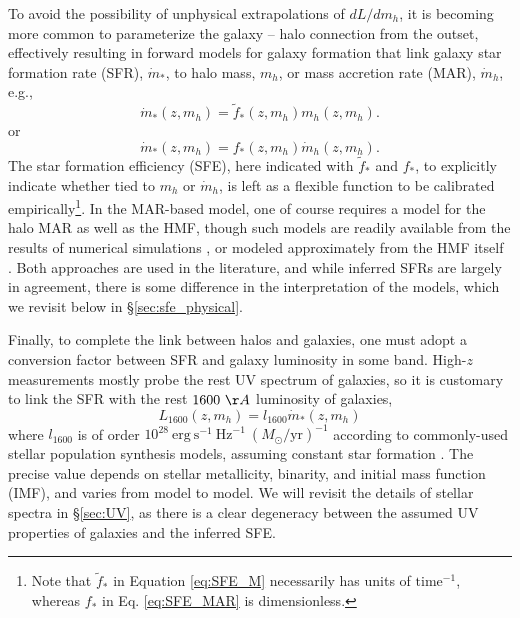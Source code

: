 To avoid the possibility of unphysical extrapolations of $dL/dm_h$, it is becoming more common to parameterize the galaxy -- halo connection from the outset, effectively resulting in forward models for galaxy formation that link galaxy star formation rate (SFR), $\dot{m}_{\ast}$, to halo mass, $m_h$, or mass accretion rate (MAR), $\dot{m}_h$, e.g.,
\begin{equation}
	\dot{m}_{\ast}(z,m_h) = \tilde{f}_{\ast}(z,m_h) m_h (z,m_h) . \label{eq:SFE_M}
\end{equation}
or
\begin{equation}
	\dot{m}_{\ast}(z,m_h) = f_{\ast}(z,m_h) \dot{m}_h (z,m_h) . \label{eq:SFE_MAR}
\end{equation}
The star formation efficiency (SFE), here indicated with $\tilde{f}_{\ast}$ and $f_{\ast}$, to explicitly indicate whether tied to $m_h$ or $\dot{m}_h$, is left as a flexible function to be calibrated empirically\footnote{Note that $\tilde{f}_{\ast}$ in Equation \ref{eq:SFE_M} necessarily has units of $\mathrm{time}^{-1}$, whereas $f_{\ast}$ in Eq. \ref{eq:SFE_MAR} is dimensionless.}. In the MAR-based model, one of course requires a model for the halo MAR as well as the HMF, though such models are readily available from the results of numerical simulations \cite{McBride2009,Trac2015}, or modeled approximately from the HMF itself \cite{Furlanetto2017}. Both approaches are used in the literature, and while inferred SFRs are largely in agreement, there is some difference in the interpretation of the models, which we revisit below in \S\ref{sec:sfe_physical}.

Finally, to complete the link between halos and galaxies, one must adopt a conversion factor between SFR and galaxy luminosity in some band. High-$z$ measurements mostly probe the rest UV spectrum of galaxies, so it is customary to link the SFR with the rest $1600 \ \AA$ luminosity of galaxies,
\begin{equation}
	L_{1600}(z, m_h) = l_{1600} \dot{m}_{\ast}(z,m_h) \label{eq:L1600}
\end{equation}
where $l_{1600}$ is of order $10^{28} \ \mathrm{erg} \ \mathrm{s}^{-1} \ \mathrm{Hz}^{-1} \ (M_{\odot} / \mathrm{yr})^{-1}$ according to commonly-used stellar population synthesis models, assuming constant star formation \cite{Leitherer1999,Eldridge2009,Conroy2009}. The precise value depends on stellar metallicity, binarity, and initial mass function (IMF), and varies from model to model. We will revisit the details of stellar spectra in \S\ref{sec:UV}, as there is a clear degeneracy between the assumed UV properties of galaxies and the inferred SFE.


